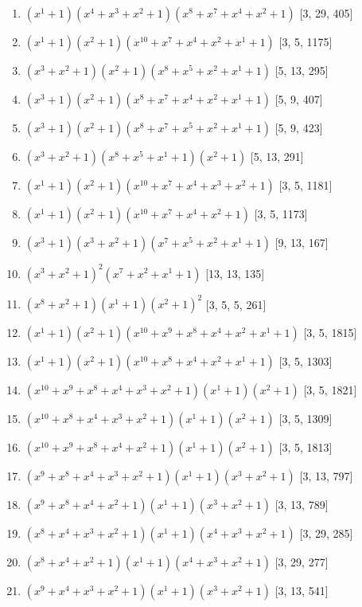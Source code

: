 \documentclass[10pt,twocolumn]{article}
\begin{document}
\begin{enumerate}
\item $(x^{1} + 1)(x^{4} + x^{3} + x^{2} + 1)(x^{8} + x^{7} + x^{4} + x^{2} + 1)$  [3, 29, 405]
\item $(x^{1} + 1)(x^{2} + 1)(x^{10} + x^{7} + x^{4} + x^{2} + x^{1} + 1)$  [3, 5, 1175]
\item $(x^{3} + x^{2} + 1)(x^{2} + 1)(x^{8} + x^{5} + x^{2} + x^{1} + 1)$  [5, 13, 295]
\item $(x^{3} + 1)(x^{2} + 1)(x^{8} + x^{7} + x^{4} + x^{2} + x^{1} + 1)$  [5, 9, 407]
\item $(x^{3} + 1)(x^{2} + 1)(x^{8} + x^{7} + x^{5} + x^{2} + x^{1} + 1)$  [5, 9, 423]
\item $(x^{3} + x^{2} + 1)(x^{8} + x^{5} + x^{1} + 1)(x^{2} + 1)$  [5, 13, 291]
\item $(x^{1} + 1)(x^{2} + 1)(x^{10} + x^{7} + x^{4} + x^{3} + x^{2} + 1)$  [3, 5, 1181]
\item $(x^{1} + 1)(x^{2} + 1)(x^{10} + x^{7} + x^{4} + x^{2} + 1)$  [3, 5, 1173]
\item $(x^{3} + 1)(x^{3} + x^{2} + 1)(x^{7} + x^{5} + x^{2} + x^{1} + 1)$  [9, 13, 167]
\item $(x^{3} + x^{2} + 1)^{2}(x^{7} + x^{2} + x^{1} + 1)$  [13, 13, 135]
\item $(x^{8} + x^{2} + 1)(x^{1} + 1)(x^{2} + 1)^{2}$  [3, 5, 5, 261]
\item $(x^{1} + 1)(x^{2} + 1)(x^{10} + x^{9} + x^{8} + x^{4} + x^{2} + x^{1} + 1)$  [3, 5, 1815]
\item $(x^{1} + 1)(x^{2} + 1)(x^{10} + x^{8} + x^{4} + x^{2} + x^{1} + 1)$  [3, 5, 1303]
\item $(x^{10} + x^{9} + x^{8} + x^{4} + x^{3} + x^{2} + 1)(x^{1} + 1)(x^{2} + 1)$  [3, 5, 1821]
\item $(x^{10} + x^{8} + x^{4} + x^{3} + x^{2} + 1)(x^{1} + 1)(x^{2} + 1)$  [3, 5, 1309]
\item $(x^{10} + x^{9} + x^{8} + x^{4} + x^{2} + 1)(x^{1} + 1)(x^{2} + 1)$  [3, 5, 1813]
\item $(x^{9} + x^{8} + x^{4} + x^{3} + x^{2} + 1)(x^{1} + 1)(x^{3} + x^{2} + 1)$  [3, 13, 797]
\item $(x^{9} + x^{8} + x^{4} + x^{2} + 1)(x^{1} + 1)(x^{3} + x^{2} + 1)$  [3, 13, 789]
\item $(x^{8} + x^{4} + x^{3} + x^{2} + 1)(x^{1} + 1)(x^{4} + x^{3} + x^{2} + 1)$  [3, 29, 285]
\item $(x^{8} + x^{4} + x^{2} + 1)(x^{1} + 1)(x^{4} + x^{3} + x^{2} + 1)$  [3, 29, 277]
\item $(x^{9} + x^{4} + x^{3} + x^{2} + 1)(x^{1} + 1)(x^{3} + x^{2} + 1)$  [3, 13, 541]

\end{enumerate}
\end{document}
